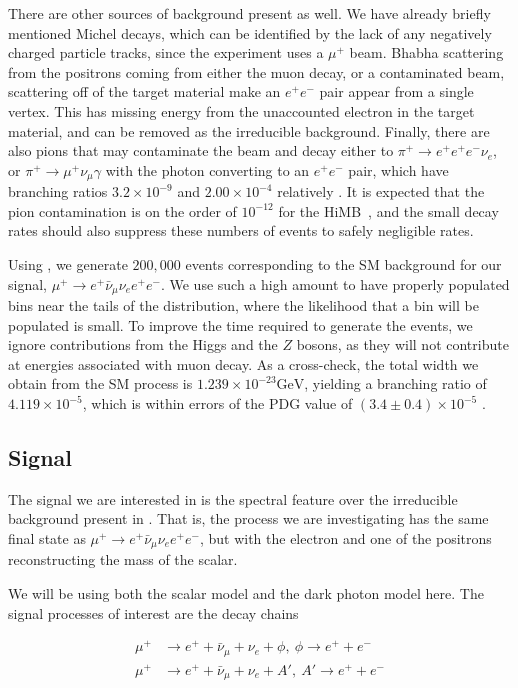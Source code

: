 There are other sources of background present as well.
We have already briefly mentioned Michel decays, which can be identified by the lack of any negatively charged particle tracks, since the experiment uses a $\mu^+$ beam.
Bhabha scattering from the positrons coming from either the muon decay, or a contaminated beam, scattering off of the target material make an $e^+ e^-$ pair appear from a single vertex.
This has missing energy from the unaccounted electron in the target material, and can be removed as the irreducible background.
Finally, there are also pions that may contaminate the beam and decay either to $\pi^+ \rightarrow e^+ e^+ e^- \nu_e$, or $\pi^+ \rightarrow \mu^+ \nu_\mu \gamma$ with the photon converting to an $e^+ e^-$ pair, which have branching ratios $3.2 \times 10^{-9}$ and $2.00 \times 10^{-4}$ relatively \cite{Agashe:2014kda}.
It is expected that the pion contamination is on the order of $10^{-12}$ for the HiMB~\cite{Blondel:2013ia}, and the small decay rates should also suppress these numbers of events to safely negligible rates.

Using \madgraph, we generate $200,000$ events corresponding to the SM background for our signal, $\mu^+ \rightarrow e^+ \bar{\nu}_\mu \nu_e e^+ e^-$.
We use such a high amount to have properly populated bins near the tails of the distribution, where the likelihood that a bin will be populated is small.
To improve the time required to generate the events, we ignore contributions from the Higgs and the $Z$ bosons, as they will not contribute at energies associated with muon decay.
As a cross-check, the total width we obtain from the SM process is $1.239\times 10^{-23}\textrm{GeV}$, yielding a branching ratio of $4.119\times 10^{-5}$, which is within errors of the PDG value of $(3.4 \pm 0.4) \times 10^{-5}$ \cite{Agashe:2014kda}.

\subsection{Signal}
The signal we are interested in is the spectral feature over the irreducible background present in \mueee.
That is, the process we are investigating has the same final state as $\mu^+ \rightarrow e^+ \bar{\nu}_\mu \nu_e e^+ e^-$, but with the electron and one of the positrons reconstructing the mass of the scalar.

We will be using both the scalar model and the dark photon model here.
The signal processes of interest are the decay chains

\begin{align}
    \mu^+ & \rightarrow e^+ + \bar{\nu}_\mu + \nu_e + \phi,~\phi \rightarrow e^+ + e^- \\
    \mu^+ & \rightarrow e^+ + \bar{\nu}_\mu + \nu_e + A',~A' \rightarrow e^+ + e^-
\end{align}

